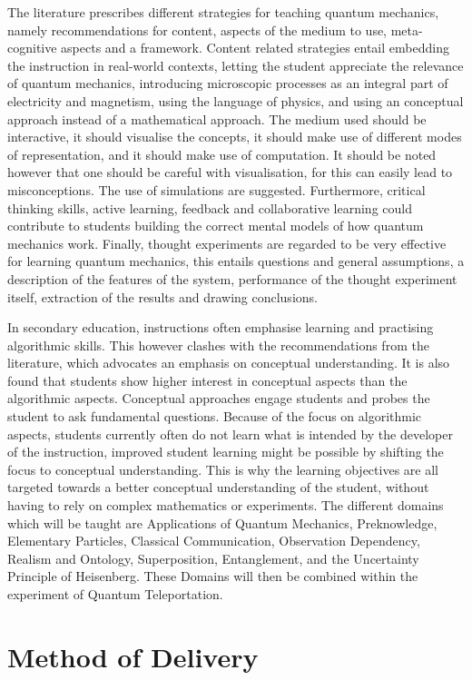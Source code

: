 \documentclass[11pt,twoside]{report} %
\begin{document}
The literature prescribes different strategies for teaching quantum mechanics, namely recommendations for content, aspects of the medium to use, meta-cognitive aspects and a framework. Content related strategies entail embedding the instruction in real-world contexts, letting the student appreciate the relevance of quantum mechanics, introducing microscopic processes as an integral part of electricity and magnetism, using the language of physics, and using an conceptual approach instead of a mathematical approach. The medium used should be interactive, it should visualise the concepts, it should make use of different modes of representation, and it should make use of computation. It should be noted however that one should be careful with visualisation, for this can easily lead to misconceptions. The use of simulations are suggested. Furthermore, critical thinking skills, active learning, feedback and collaborative learning could contribute to students building the correct mental models of how quantum mechanics work. Finally, thought experiments are regarded to be very effective for learning quantum mechanics, this entails questions and general assumptions, a description of the features of the system, performance of the thought experiment itself, extraction of the results and drawing conclusions.

In secondary education, instructions often emphasise learning and practising algorithmic skills. This however clashes with the recommendations from the literature, which advocates an emphasis on conceptual understanding. It is also found that students show higher interest in conceptual aspects than the algorithmic aspects. Conceptual approaches engage students and probes the student to ask fundamental questions. Because of the focus on algorithmic aspects, students currently often do not learn what is intended by the developer of the instruction, improved student learning might be possible by shifting the focus to conceptual understanding. This is why the learning objectives are all targeted towards a better conceptual understanding of the student, without having to rely on complex mathematics or experiments. The different domains which will be taught are Applications of Quantum Mechanics, Preknowledge, Elementary Particles, Classical Communication, Observation Dependency, Realism and Ontology, Superposition, Entanglement, and the Uncertainty Principle of Heisenberg. These Domains will then be combined within the experiment of Quantum Teleportation.

\chapter{Method of Delivery}
\end{document}
